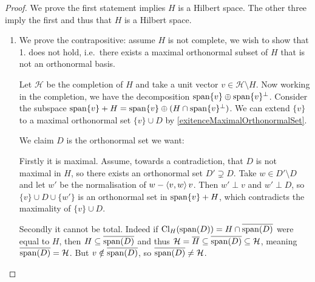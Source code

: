 \begin{proof}
We prove the first statement implies $H$ is a Hilbert space. The other three imply the first and thus that $H$ is a Hilbert space.
\begin{enumerate}
\item We prove the contrapositive: assume $H$ is not complete, we wish to show that 1. does not hold, i.e.\ there exists a maximal orthonormal subset of $H$ that is not an orthonormal basis.

Let $\mathcal{H}$ be the completion of $H$ and take a unit vector $v\in \mathcal{H}\setminus H$. Now working in the completion, we have the decomposition $\operatorname{span}\{v\}\oplus \operatorname{span}\{v\}^\perp$. Consider the subspace $\operatorname{span}\{v\} + H = \operatorname{span}\{v\}\oplus(H\cap \operatorname{span}\{v\}^\perp)$. We can extend $\{v\}$ to a maximal orthonormal set $\{v\}\cup D$ by \ref{exitenceMaximalOrthonormalSet}.

We claim $D$ is the orthonormal set we want:

Firstly it is maximal.
Assume, towards a contradiction, that $D$ is not maximal in $H$, so there exists an orthonormal set $D'\supsetneq D$. Take $w\in D'\setminus D$ and let $w'$ be the normalisation of $w - \left\langle v,w \right\rangle v$. Then $w' \perp v$ and $w' \perp D$, so $\{v\}\cup D\cup\{w'\}$ is an orthonormal set in $\operatorname{span}\{v\} + H$, which contradicts the maximality of $\{v\}\cup D$.

Secondly it cannot be total. Indeed if $\operatorname{Cl}_H(\operatorname{span}(D)) = H\cap\overline{\operatorname{span}(D)}$ were equal to $H$, then $H \subseteq \overline{\operatorname{span}(D)}$ and thus $\mathcal{H} = \overline{H} \subseteq \overline{\operatorname{span}(D)} \subseteq \mathcal{H}$, meaning $\overline{\operatorname{span}(D)} = \mathcal{H}$. But $v\notin \overline{\operatorname{span}(D)}$, so $\overline{\operatorname{span}(D)} \neq \mathcal{H}$.


\end{enumerate}
\end{proof}
